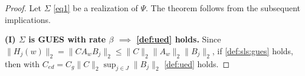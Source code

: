 \documentclass[journal,twoside,web]{ieeecolor}
\begin{document}
  \begin{proof}%
     Let $\Sigma$ \eqref{eq1}
     be a realization of $\Psi$.
     The theorem follows from the subsequent implications.
     
    \textbf{(I) $\Sigma$ is GUES with rate $\beta$ $\implies$ \eqref{def:ued} holds.}
   Since 
   $\|H_j(w)\|_2=\|CA_wB_j\|_2
   \le \|C\|_2 \|A_w\|_2\|B_j\|_2$,
   if
   \eqref{def:sls:gues} holds, then
    with $C_{ed}=C_g \|C\|_2 \sup_{j \in J} \|B_j\|_2$ \eqref{def:ued}
    holds.
    

\end{proof}
\end{document}
